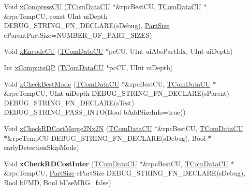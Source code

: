 \begin{DoxyCompactItemize}
\item 
Void \hyperlink{class_t_enc_cu_a946d67fc7049f24c345306bee2f411e2}{x\+Compress\+CU} (\hyperlink{class_t_com_data_c_u}{T\+Com\+Data\+CU} $\ast$\&rpc\+Best\+CU, \hyperlink{class_t_com_data_c_u}{T\+Com\+Data\+CU} $\ast$\&rpc\+Temp\+CU, const U\+Int ui\+Depth D\+E\+B\+U\+G\+\_\+\+S\+T\+R\+I\+N\+G\+\_\+\+F\+N\+\_\+\+D\+E\+C\+L\+A\+RE(s\+Debug), \hyperlink{_type_def_8h_a0093b7809f3cfae06fda9d67441267bd}{Part\+Size} e\+Parent\+Part\+Size=N\+U\+M\+B\+E\+R\+\_\+\+O\+F\+\_\+\+P\+A\+R\+T\+\_\+\+S\+I\+Z\+ES)
\item 
Void \hyperlink{class_t_enc_cu_a192455dc77c70cb7ec012f81332ae036}{x\+Encode\+CU} (\hyperlink{class_t_com_data_c_u}{T\+Com\+Data\+CU} $\ast$pc\+CU, U\+Int ui\+Abs\+Part\+Idx, U\+Int ui\+Depth)
\item 
Int \hyperlink{class_t_enc_cu_ac3ce860dbe7ff14b78702e887f1586ce}{x\+Compute\+QP} (\hyperlink{class_t_com_data_c_u}{T\+Com\+Data\+CU} $\ast$pc\+CU, U\+Int ui\+Depth)
\item 
Void \hyperlink{class_t_enc_cu_af02e51c0dc253c97693e9d467b8a4663}{x\+Check\+Best\+Mode} (\hyperlink{class_t_com_data_c_u}{T\+Com\+Data\+CU} $\ast$\&rpc\+Best\+CU, \hyperlink{class_t_com_data_c_u}{T\+Com\+Data\+CU} $\ast$\&rpc\+Temp\+CU, U\+Int ui\+Depth D\+E\+B\+U\+G\+\_\+\+S\+T\+R\+I\+N\+G\+\_\+\+F\+N\+\_\+\+D\+E\+C\+L\+A\+RE(s\+Parent) D\+E\+B\+U\+G\+\_\+\+S\+T\+R\+I\+N\+G\+\_\+\+F\+N\+\_\+\+D\+E\+C\+L\+A\+RE(s\+Test) D\+E\+B\+U\+G\+\_\+\+S\+T\+R\+I\+N\+G\+\_\+\+P\+A\+S\+S\+\_\+\+I\+N\+TO(Bool b\+Add\+Size\+Info=true))
\item 
Void \hyperlink{class_t_enc_cu_ab8e5f1a8db9f82fa0e6f98ca11f4ecfa}{x\+Check\+R\+D\+Cost\+Merge2\+Nx2N} (\hyperlink{class_t_com_data_c_u}{T\+Com\+Data\+CU} $\ast$\&rpc\+Best\+CU, \hyperlink{class_t_com_data_c_u}{T\+Com\+Data\+CU} $\ast$\&rpc\+Temp\+CU D\+E\+B\+U\+G\+\_\+\+S\+T\+R\+I\+N\+G\+\_\+\+F\+N\+\_\+\+D\+E\+C\+L\+A\+RE(s\+Debug), Bool $\ast$early\+Detection\+Skip\+Mode)
\item 
\mbox{\label{class_t_enc_cu_a85d245424d2acfa1b0aabe56e6f73fde}} 
Void {\bfseries x\+Check\+R\+D\+Cost\+Inter} (\hyperlink{class_t_com_data_c_u}{T\+Com\+Data\+CU} $\ast$\&rpc\+Best\+CU, \hyperlink{class_t_com_data_c_u}{T\+Com\+Data\+CU} $\ast$\&rpc\+Temp\+CU, \hyperlink{_type_def_8h_a0093b7809f3cfae06fda9d67441267bd}{Part\+Size} e\+Part\+Size D\+E\+B\+U\+G\+\_\+\+S\+T\+R\+I\+N\+G\+\_\+\+F\+N\+\_\+\+D\+E\+C\+L\+A\+RE(s\+Debug), Bool b\+F\+MD, Bool b\+Use\+M\+RG=false)
\item 

\end{DoxyCompactItemize}
